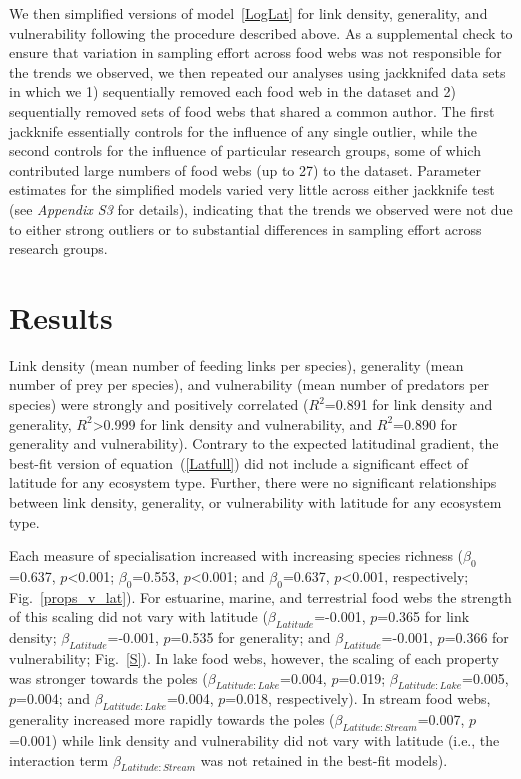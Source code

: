 \documentclass[12pt]{article}
\begin{document}
    We then simplified versions of model~\ref{LogLat} for link density, generality, and vulnerability following the procedure described above.
    As a supplemental check to ensure that variation in sampling effort
    across food webs was not responsible for the trends we observed, we then
    repeated our analyses using jackknifed data sets in which we 1) sequentially
    removed each food web in the dataset and 2) sequentially removed sets of food webs
    that shared a common author. The first jackknife essentially controls for the
    influence of any single outlier, while the second controls for the influence
    of particular research groups, some of which contributed large numbers of food
    webs (up to 27) to the dataset. Parameter estimates for the simplified models 
    varied very little across either jackknife test (see \emph{Appendix S3} for details),
    indicating that the trends we observed were not due to either strong outliers or
    to substantial differences in sampling effort across research groups.


\section*{Results}

  Link density (mean number of feeding links per species), generality (mean
  number of prey per species), and vulnerability (mean number of predators per
  species) were strongly and positively correlated ($R^2$=0.891 for link
  density and generality, $R^2$\textgreater0.999 for link density and
  vulnerability, and $R^2$=0.890 for generality and vulnerability). Contrary
  to the expected latitudinal gradient, the best-fit version of
  equation~(\ref{Latfull}) did not include a significant
  effect of latitude for any ecosystem type. Further, there were no significant
  relationships between link density, generality, or vulnerability with
  latitude for any ecosystem type.


  Each measure of specialisation increased with increasing
  species richness ($\beta_0$=0.637, $p$\textless0.001; $\beta_0$=0.553,
  $p$\textless0.001; and $\beta_0$=0.637, $p$\textless0.001, respectively;
  Fig.~\ref{props_v_lat}). For estuarine, marine, and terrestrial food webs the
  strength of this scaling did not vary with latitude
  ($\beta_{Latitude}$=-0.001, $p$=0.365 for link density;
  $\beta_{Latitude}$=-0.001, $p$=0.535 for generality; and
  $\beta_{Latitude}$=-0.001, $p$=0.366 for vulnerability; Fig.~\ref{S}). In
  lake food webs, however, the scaling of each property was stronger towards
  the poles ($\beta_{Latitude:Lake}$=0.004, $p$=0.019;
  $\beta_{Latitude:Lake}$=0.005, $p$=0.004; and
  $\beta_{Latitude:Lake}$=0.004, $p$=0.018, respectively). In stream food
  webs, generality increased more rapidly towards the poles
  ($\beta_{Latitude:Stream}$=0.007, $p$=0.001) while link density and
  vulnerability did not vary with latitude (i.e., the interaction term 
  $\beta_{Latitude:Stream}$ was not retained in the best-fit models).
\end{document}
